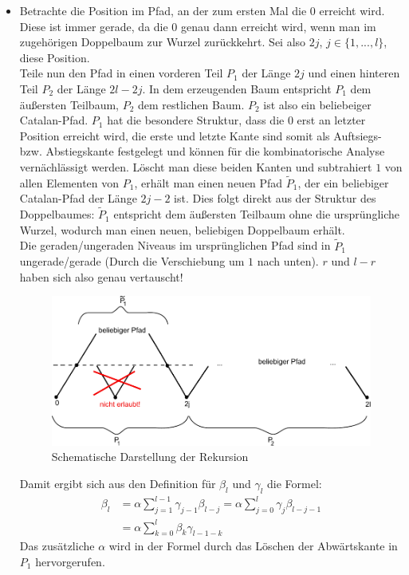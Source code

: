 \documentclass[a4paper, 11pt]{scrreprt}
\begin{document}
\begin{itemize}
\item
Betrachte die Position im Pfad, an der zum ersten Mal die \(0\) erreicht wird. Diese ist immer gerade, da die \(0\) genau dann erreicht wird, wenn man im zugehörigen Doppelbaum zur Wurzel zurückkehrt. Sei also \(2j\), \(j\in\{1,...,l\}\), diese Position. \\
Teile nun den Pfad in einen vorderen Teil \(P_1\) der Länge \(2j\) und einen hinteren Teil \(P_2\) der Länge \(2l-2j\). In dem erzeugenden Baum entspricht \(P_1\) dem äußersten Teilbaum, \(P_2\) dem restlichen Baum. \(P_2\) ist also ein beliebeiger Catalan-Pfad. \(P_1\) hat die besondere Struktur, dass die \(0\) erst an letzter Position erreicht wird, die erste und letzte Kante sind somit als Auftsiegs- bzw. Abstiegskante festgelegt und können für die kombinatorische Analyse vernächlässigt werden. Löscht man diese beiden Kanten und subtrahiert \(1\) von allen Elementen von \(P_1\), erhält man einen neuen Pfad \(\tilde{P}_1\), der ein beliebiger Catalan-Pfad der Länge \(2j-2\) ist. Dies folgt direkt aus der Struktur des Doppelbaumes: \(\tilde{P}_1\) entspricht dem äußersten Teilbaum ohne die ursprüngliche Wurzel, wodurch man einen neuen, beliebigen Doppelbaum erhält. \\
Die geraden/ungeraden Niveaus im ursprünglichen Pfad sind in \(\tilde{P}_1\) ungerade/gerade (Durch die Verschiebung um \(1\) nach unten). \(r\) und \(l-r\) haben sich also genau vertauscht!
\begin{figure}[htpb]
	\centering
	\includegraphics[width=1.00\textwidth]{Rekursion-Visualisierung.pdf}
	\caption{Schematische Darstellung der Rekursion}
\end{figure}
Damit ergibt sich aus den Definition für \(\beta_l\) und \(\gamma_l\) die Formel:
\begin{equation}
	\begin{split}
		\beta_l &= \alpha\sum_{j=1}^{l-1}\gamma_{j-1}\beta_{l-j} = \alpha\sum_{j=0}^l \gamma_j\beta_{l-j-1}\\
		&=\alpha\sum_{k=0}^l \beta_k\gamma_{l-1-k}
	\end{split}
\end{equation}
Das zusätzliche \(\alpha\) wird in der Formel durch das Löschen der Abwärtskante in \(P_1\) hervorgerufen.\\



\end{itemize}
\end{document}
